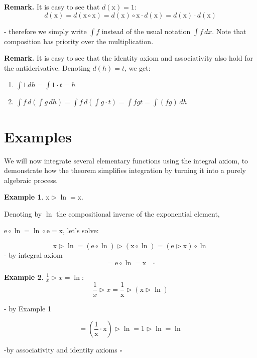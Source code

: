 \documentclass[12pt]{article}
\theoremstyle{definition}
\newtheorem{example}{Example}
\begin{document}
\vspace{10pt}
\noindent\textbf{Remark.} It is easy to see that $d(\mathrm{x}) = 1$:
\[
d(\mathrm{x}) = d(\mathrm{x} \circ \mathrm{x}) = d(\mathrm{x}) \circ \mathrm{x} \cdot d(\mathrm{x}) = d(\mathrm{x}) \cdot d(\mathrm{x})
\]

- therefore we simply write $\int f$ instead of the usual notation $\int f \, dx$. 
Note that composition has priority over the multiplication.

\vspace{10pt}
\noindent\textbf{Remark.} It is easy to see that the identity axiom and associativity also 
hold for the antiderivative. Denoting $d(h) = t$, we get:

\begin{enumerate}
\item $\int 1 \, dh = \int 1 \cdot t = h$  
\item $\int f \, d(\int g \, dh) = \int f \, d(\int g \cdot t) = \int fgt = \int (fg) \, dh$
\end{enumerate}

\newpage
\section*{Examples}

We will now integrate several elementary functions using the integral axiom, 
to demonstrate how the theorem simplifies integration by turning it into a purely algebraic process.

\begin{example} $\mathrm{x} \triangleright \ln =\mathrm{x} $. 
    
    Denoting by $\ln$ the compositional inverse of the exponential element, 
    
    $\mathrm{e} \circ \ln = \ln \circ \mathrm{e} = \mathrm{x}$, let's solve:

\[
\mathrm{x} \triangleright \ln = (\mathrm{e} \circ \ln) \triangleright (\mathrm{x} \circ \ln) = (\mathrm{e} \triangleright \mathrm{x}) \circ \ln
\]
- by integral axiom
\[
= \mathrm{e} \circ \ln = \mathrm{x} \quad \square
\]

\end{example}

\begin{example} $\frac{1}{x}  \triangleright x= \ln$:
\[
\frac{1}{x}  \triangleright x = \frac{1}{\mathrm{x}}  \triangleright (\mathrm{x} \triangleright \ln)
\]

- by Example 1

\[
= (\frac{1}{\mathrm{x}}  \cdot \mathrm{x}) \triangleright \ln = 1 \triangleright \ln = \ln
\]

-by associativity and identity axioms    $\square$
\end{example}
\end{document}
